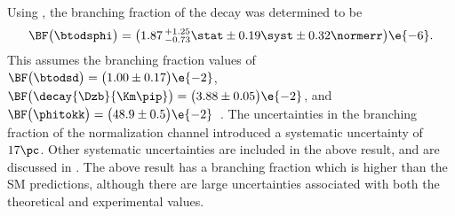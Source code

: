Using , the branching fraction of the decay \btodsphi was determined to be
\begin{equation}
  \BF\big(\btodsphi\big) =
  \big(1.87\,^{+1.25}_{-0.73}\stat\pm0.19\syst\pm0.32\normerr\big)\e{-6}.
  \label{eq:dsphi:result}
\end{equation}
This assumes the branching fraction values of
$\BF\big(\btodsd\big)=\big(1.00\pm0.17\big)\e{-2}$,
$\BF\big(\decay{\Dzb}{\Km\pip}\big)=\big(3.88\pm0.05\big)\e{-2}$, and
$\BF\big(\phitokk\big)=\big(48.9\pm0.5\big)\e{-2}$~\cite{PDG2012}.
The uncertainties in the branching fraction of the normalization channel introduced a systematic
uncertainty of $17\pc$.
Other systematic uncertainties are included in the above result, and are discussed in
.
The above result has a branching fraction which is higher than the SM predictions, although there
are large uncertainties associated with both the theoretical and experimental values.





